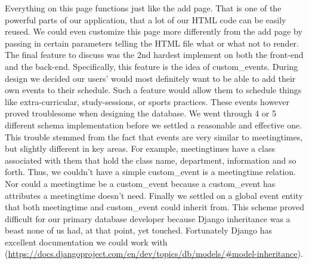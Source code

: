 \documentclass[pdftex,12pt,letter]{article}
\begin{document}
Everything on this page functions just like the add page. That is one of the powerful parts of our application, that a lot of our HTML code can be easily reused. We could even customize this page more differently from the add page by passing in certain parameters telling the HTML file what or what not to render.\\

The final feature to discuss was the 2nd hardest implement on both the front-end and the back-end. Specifically, this feature is the idea of custom\_events. During design we decided our users' would most definitely want to be able to add their own events to their schedule. Such a feature would allow them to schedule things like extra-curricular, study-sessions, or sports practices. These events however proved troublesome when designing the database. We went through 4 or 5 different schema implementation before we settled a reasonable and effective one. This trouble stemmed from the fact that events are very similar to meetingtimes, but slightly different in key areas. For example, meetingtimes have a class associated with them that hold the class name, department, information and so forth. Thus, we couldn't have a simple custom\_event is a meetingtime relation. Nor could a meetingtime be a custom\_event because a custom\_event has attributes a meetingtime doesn't need. Finally we settled on a global event entity that both meetingtime and custom\_event could inherit from. This scheme proved difficult for our primary database developer because Django inheritance was a beast none of us had, at that point, yet touched. Fortunately Django has excellent documentation we could work with (\url{https://docs.djangoproject.com/en/dev/topics/db/models/#model-inheritance}).\\
\end{document}
